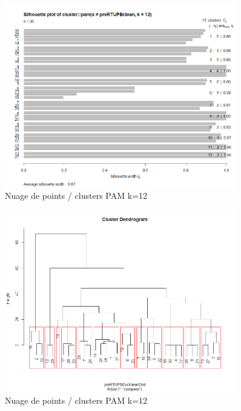 \begin{figure}[H]
\centering
\includegraphics[width=0.90\textwidth]{../Fig/RTUPB/rtupb-sil-k12-pre.png}
\caption{Nuage de points / clusters PAM k=12 }
\end{figure}

\begin{figure}[H]
\centering
\includegraphics[width=0.90\textwidth]{../Fig/RTUPB/rtupb-cah-k12-pre.png}
\caption{Nuage de points / clusters PAM k=12 }
\end{figure}


%
%







